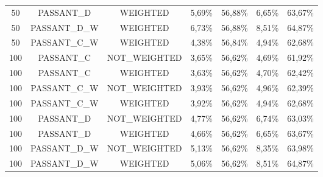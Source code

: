 \begin{table}[H]
{\begin{tabular}{ccccccc}
	50 &  PASSANT\_D &   WEIGHTED &     5,69\% &    56,88\% &     6,65\% &    63,67\% \\
	
	50 & PASSANT\_D\_W &   WEIGHTED &     6,73\% &    56,88\% &     8,51\% &    64,87\% \\
	
	50 & PASSANT\_C\_W &   WEIGHTED &     4,38\% &    56,84\% &     4,94\% &    62,68\% \\
	
	100 &  PASSANT\_C & NOT\_WEIGHTED &     3,65\% &    56,62\% &     4,69\% &    61,92\% \\
	
	100 &  PASSANT\_C &   WEIGHTED &     3,63\% &    56,62\% &     4,70\% &    62,42\% \\
	
	100 & PASSANT\_C\_W & NOT\_WEIGHTED &     3,93\% &    56,62\% &     4,96\% &    62,39\% \\
	
	100 & PASSANT\_C\_W &   WEIGHTED &     3,92\% &    56,62\% &     4,94\% &    62,68\% \\
	
	100 &  PASSANT\_D & NOT\_WEIGHTED &     4,77\% &    56,62\% &     6,74\% &    63,03\% \\
	
	100 &  PASSANT\_D &   WEIGHTED &     4,66\% &    56,62\% &     6,65\% &    63,67\% \\
	
	100 & PASSANT\_D\_W & NOT\_WEIGHTED &     5,13\% &    56,62\% &     8,35\% &    63,98\% \\
	
	100 & PASSANT\_D\_W &   WEIGHTED &     5,06\% &    56,62\% &     8,51\% &    64,87\% \\
	
\end{tabular}  
}
\end{table}

